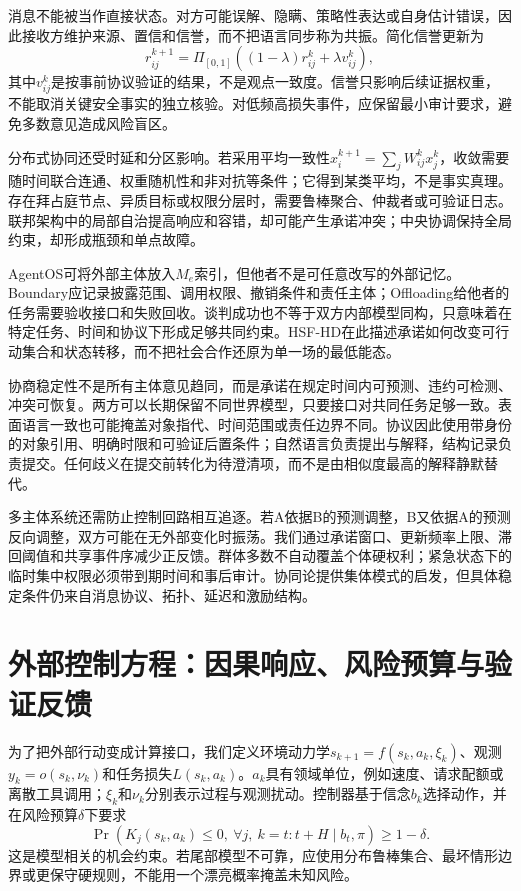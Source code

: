 消息不能被当作直接状态。对方可能误解、隐瞒、策略性表达或自身估计错误，因此接收方维护来源、置信和信誉，而不把语言同步称为共振。简化信誉更新为
\begin{equation}
r_{ij}^{k+1}=\Pi_{[0,1]}\!\left((1-\lambda)r_{ij}^k+\lambda v_{ij}^k\right),
\end{equation}
其中$v_{ij}^k$是按事前协议验证的结果，不是观点一致度。信誉只影响后续证据权重，不能取消关键安全事实的独立核验。对低频高损失事件，应保留最小审计要求，避免多数意见造成风险盲区。

分布式协同还受时延和分区影响。若采用平均一致性$x_i^{k+1}=\sum_jW_{ij}^kx_j^k$，收敛需要随时间联合连通、权重随机性和非对抗等条件；它得到某类平均，不是事实真理。存在拜占庭节点、异质目标或权限分层时，需要鲁棒聚合、仲裁者或可验证日志。联邦架构中的局部自治提高响应和容错，却可能产生承诺冲突；中央协调保持全局约束，却形成瓶颈和单点故障。

AgentOS可将外部主体放入$M_e$索引，但他者不是可任意改写的外部记忆。Boundary应记录披露范围、调用权限、撤销条件和责任主体；Offloading给他者的任务需要验收接口和失败回收。谈判成功也不等于双方内部模型同构，只意味着在特定任务、时间和协议下形成足够共同约束。HSF-HD在此描述承诺如何改变可行动集合和状态转移，而不把社会合作还原为单一场的最低能态。

协商稳定性不是所有主体意见趋同，而是承诺在规定时间内可预测、违约可检测、冲突可恢复。两方可以长期保留不同世界模型，只要接口对共同任务足够一致。表面语言一致也可能掩盖对象指代、时间范围或责任边界不同。协议因此使用带身份的对象引用、明确时限和可验证后置条件；自然语言负责提出与解释，结构记录负责提交。任何歧义在提交前转化为待澄清项，而不是由相似度最高的解释静默替代。

多主体系统还需防止控制回路相互追逐。若A依据B的预测调整，B又依据A的预测反向调整，双方可能在无外部变化时振荡。我们通过承诺窗口、更新频率上限、滞回阈值和共享事件序减少正反馈。群体多数不自动覆盖个体硬权利；紧急状态下的临时集中权限必须带到期时间和事后审计。协同论提供集体模式的启发，但具体稳定条件仍来自消息协议、拓扑、延迟和激励结构。

\section{外部控制方程：因果响应、风险预算与验证反馈}
\label{sec:section_7154}

为了把外部行动变成计算接口，我们定义环境动力学$s_{k+1}=f(s_k,a_k,\xi_k)$、观测$y_k=o(s_k,\nu_k)$和任务损失$L(s_k,a_k)$。$a_k$具有领域单位，例如速度、请求配额或离散工具调用；$\xi_k$和$\nu_k$分别表示过程与观测扰动。控制器基于信念$b_k$选择动作，并在风险预算$\delta$下要求
\begin{equation}
\Pr\!\left(K_j(s_k,a_k)\le0,\ \forall j,\ k=t{:}t+H\mid b_t,\pi\right)\ge1-\delta.
\end{equation}
这是模型相关的机会约束。若尾部模型不可靠，应使用分布鲁棒集合、最坏情形边界或更保守硬规则，不能用一个漂亮概率掩盖未知风险。

